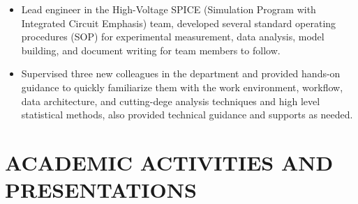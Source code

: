 \documentclass[margin, 10pt]{res} %
\begin{document}
\begin{resume}
\begin{itemize}
    \item Lead engineer in the High-Voltage SPICE (Simulation Program with Integrated Circuit Emphasis) team, developed several standard operating procedures (SOP) for experimental measurement, data analysis, model building, and document writing for team members to follow.
    \item Supervised three new colleagues in the department and provided hands-on guidance to quickly familiarize them with the work environment, workflow, data architecture, and cutting-dege analysis techniques and high level statistical methods, also provided technical guidance and supports as needed.
\end{itemize}


\section{ACADEMIC ACTIVITIES AND PRESENTATIONS}


\end{resume}
\end{document}
